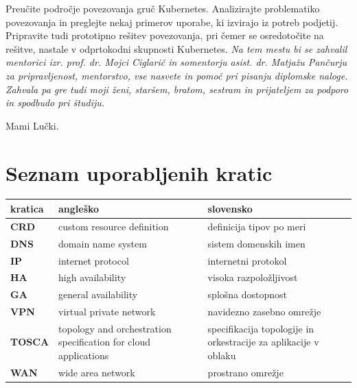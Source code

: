 \documentclass[a4paper, 12pt]{book}
\newcommand{\clearemptydoublepage}{\newpage{\pagestyle{empty}\cleardoublepage}}
\begin{document}
Preučite področje povezovanja gruč Kubernetes. Analizirajte problematiko povezovanja in preglejte nekaj primerov uporabe, ki izvirajo iz potreb podjetij. Pripravite tudi prototipno rešitev povezovanja, pri čemer se osredotočite na rešitve, nastale v odprtokodni skupnosti Kubernetes.
\vspace{15mm}
\vspace{2cm}
\clearemptydoublepage
\thispagestyle{empty}\mbox{}\vfill\null\it%
\noindent
Na tem mestu bi se zahvalil mentorici izr. prof. dr. Mojci Ciglarič in somentorju asist. dr. Matjažu Pančurju za pripravljenost, mentorstvo, vse nasvete in pomoč pri pisanju diplomske naloge.
Zahvala pa gre tudi moji ženi, staršem, bratom, sestram in prijateljem za podporo in spodbudo pri študiju.
\rm\normalfont
\clearemptydoublepage
\thispagestyle{empty}\mbox{}{\textheight}\mbox{}\hfill\begin{minipage}{0.55\textwidth}%
Mami Lučki.
\normalfont\end{minipage}
\clearemptydoublepage
\pagestyle{empty}
\def\thepage{}%
\tableofcontents{}
\clearemptydoublepage
\chapter*{Seznam uporabljenih kratic}  %
\noindent\begin{tabular}{p{}|p{}|p{}}    %
  {\bf kratica} & {\bf angleško}                             & {\bf slovensko} \\ \hline
  {\bf CRD} & custom resource definition & definicija tipov po meri \\
  {\bf DNS} & domain name system & sistem domenskih imen \\
  {\bf IP} & internet protocol & internetni protokol \\
  {\bf HA} & high availability & visoka razpoložljivost \\
  {\bf GA} & general availability & splošna dostopnost \\
  {\bf VPN} & virtual private network & navidezno zasebno omrežje \\
  {\bf TOSCA} & topology and orchestration specification for cloud applications & specifikacija topologije in orkestracije za aplikacije v oblaku \\
  {\bf WAN} & wide area network & prostrano omrežje \\
\end{tabular}
\clearemptydoublepage
\end{document}
